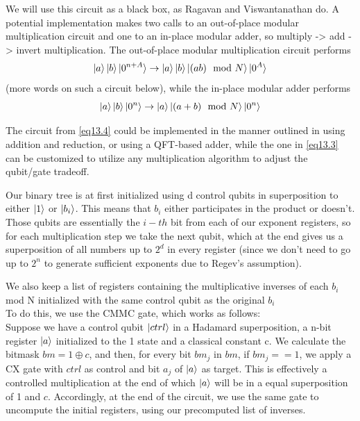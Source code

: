 We will use this circuit as a black box, as Ragavan and Viswantanathan do.
A potential implementation makes two calls to an out-of-place modular multiplication circuit and one to an in-place modular adder, so multiply -> add -> invert multiplication. The out-of-place modular multiplication circuit performs
\begin{equation}
    \ket{a}  \ket{b}  \ket{0^{n + A}} \to \ket{a}  \ket{b}  \ket{(ab) \mod N} \ket{0^{A}}
    \label{eq13.3}
\end{equation}
(more words on such a circuit below), while the in-place modular adder performs
\begin{equation}
    \ket{a} \ket{b} \ket{0^n} \to \ket{a} \ket{(a + b) \mod N} \ket{0^n}
    \label{eq13.4}
\end{equation} 

The circuit from \eqref{eq13.4} could be implemented in the manner outlined in \cite{Roetteler2017} using addition and reduction, or using a QFT-based adder, while the one in \eqref{eq13.3} can be customized to utilize any multiplication algorithm to adjust the qubit/gate tradeoff. 


Our binary tree is at first initialized using d control qubits in superposition to either $\ket{1}$ or $\ket{b_i}$. This means that $b_i$ either participates in the product or doesn't. Those qubits are essentially the $i-th$ bit from each of our exponent registers, so for each multiplication step we take the next qubit, which at the end gives us a superposition of all numbers up to $2^d$ in every register (since we don't need to go up to $2^n$ to generate sufficient exponents due to Regev's assumption).

We also keep a list of registers containing the multiplicative inverses of each $b_i$ mod N initialized with the same control qubit as the original $b_i$\\ 
To do this, we use the CMMC gate, which works as follows:\\
Suppose we have a control qubit $\ket{ctrl}$ in a Hadamard superposition, a n-bit register $\ket a$ initialized to the 1 state  and a classical constant c. We calculate the bitmask $bm = 1 \oplus c$, and then, for every bit $bm_j$ in $bm$, if $bm_j == 1$, we apply a CX gate with $ctrl$ as control and bit $a_j$ of $\ket a$ as target. This is effectively a controlled multiplication at the end of which $\ket{a}$ will be in a equal superposition of 1 and $c$.
Accordingly, at the end of the circuit, we use the same gate to uncompute the initial registers, using our precomputed list of inverses.\\

